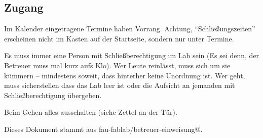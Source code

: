 \documentclass{\basedir/fablab-document}
\begin{document}
\subsection{Zugang}
Im Kalender eingetragene Termine haben Vorrang. Achtung, \enquote{Schließungszeiten} erscheinen nicht im Kasten auf der Startseite, sondern nur unter Termine.

Es muss immer eine Person mit Schließberechtigung im Lab sein (Es sei denn, der Betreuer muss mal kurz aufs Klo). Wer Leute reinlässt, muss sich um sie kümmern -- mindestens soweit, dass hinterher keine Unordnung ist. Wer geht, muss sicherstellen dass das Lab leer ist oder die Aufsicht an jemanden mit Schließberechtigung übergeben.

Beim Gehen alles ausschalten (siehe Zettel an der Tür).



Dieses Dokument stammt aus fau-fablab/betreuer-einweisung@\Revision{}.
\end{document}
